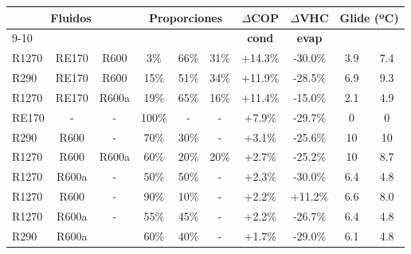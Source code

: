 
\begin{tabular}{|lcc|ccc|c|c|c|c|}
\hline
\multicolumn{3}{|c|}{\multirow{2}{*}{\textbf{Fluidos}}} & \multicolumn{3}{c|}{\multirow{2}{*}{\textbf{Proporciones}}} & \multicolumn{1}{c|}{\multirow{2}{*}{\textbf{$\Delta$COP}}} & \multicolumn{1}{c|}{\multirow{2}{*}{\textbf{$\Delta$VHC}}} & \multicolumn{2}{c|}{\textbf{Glide (ºC)}} \\ \cline{9-10} 
\multicolumn{3}{|c|}{} & \multicolumn{3}{c|}{} & \multicolumn{1}{c|}{} & \multicolumn{1}{c|}{} & \multicolumn{1}{c|}{\textbf{cond}} & \multicolumn{1}{c|}{\textbf{evap}} \\ \hline
R1270 & RE170 & R600 & 3\% & 66\% & 31\% & +14.3\% & -30.0\% & 3.9 & 7.4 \\ \hline
R290 & RE170 & R600 & 15\% & 51\% & 34\% & +11.9\% & -28.5\% & 6.9 & 9.3 \\ \hline
R1270 & RE170 & R600a & 19\% & 65\% & 16\% & +11.4\% & -15.0\% & 2.1 & 4.9 \\ \hline
RE170 & - & - & 100\% & - & - & +7.9\% & -29.7\% & 0 & 0 \\ \hline
R290 & R600 & - & 70\% & 30\% & - & +3.1\% & -25.6\% & 10 & 10 \\ \hline
R1270 & R600 & R600a & 60\% & 20\% & 20\% & +2.7\% & -25.2\% & 10 & 8.7 \\ \hline
R1270 & R600a & - & 50\% & 50\% & - & +2.3\% & -30.0\% & 6.4 & 4.8 \\ \hline
R1270 & R600 & - & 90\% & 10\% & - & +2.2\% & +11.2\% & 6.6 & 8.0 \\ \hline
R1270 & R600a & - & 55\% & 45\% & - & +2.2\% & -26.7\% & 6.4 & 4.8 \\ \hline
R290 & R600a &  & 60\% & 40\% & - & +1.7\% & -29.0\% & 6.1 & 4.8 \\ \hline
\end{tabular}
